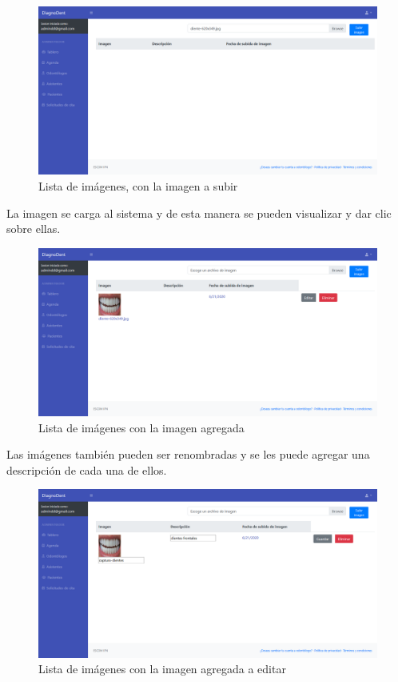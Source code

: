 \begin{figure}[H]
\centering
\includegraphics[width=17cm,keepaspectratio]{pictures/adminodo/pacientes/imagenes/lista-imagenes-2.png}
\caption{Lista de imágenes, con la imagen a subir}
\end{figure}

La imagen se carga al sistema y de esta manera se pueden visualizar y dar clic sobre ellas.

\begin{figure}[H]
\centering
\includegraphics[width=17cm,keepaspectratio]{pictures/adminodo/pacientes/imagenes/lista-imagenes-llena-1.png}
\caption{Lista de imágenes con la imagen agregada}
\end{figure}

Las imágenes también pueden ser renombradas y se les puede agregar una descripción de cada una de ellos.

\begin{figure}[H]
\centering
\includegraphics[width=17cm,keepaspectratio]{pictures/adminodo/pacientes/imagenes/lista-imagenes-llena-2.png}
\caption{Lista de imágenes con la imagen agregada a editar}
\end{figure}

